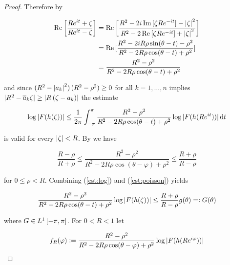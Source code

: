 \begin{proof}
	Therefore by

	\begin{equation*}
		\begin{aligned}
			\Re \sbr[3]{\frac{R e^{it} + \zeta}{R e^{it} - \zeta}} &= \Re \sbr[3]{\frac{R^2 - 2i \Im \sbr[0]{ \zeta R e^{-it} } - \abs[0]{ \zeta }^2}{R^2 - 2\Re \sbr[0]{ \zeta R e^{-it} } + \abs[0]{ \zeta }^2}}\\ &= \Re \sbr[0]{\frac{R^2 - 2iR\rho \sin( \theta - t ) - \rho^2 }{R^2 - 2R\rho \cos( \theta - t ) + \rho^2}}\\
			&= \frac{R^2 - \rho^2}{R^2 - 2R\rho \cos( \theta - t ) + \rho^2}
		\end{aligned}
	\end{equation*}

	\noindent and since $\del[0]{ R^2 - \abs[0]{ a_k }^2 }\del[0]{ R^2 - \rho^2 }\geq 0$ for all $k = 1,\dots,n$ implies $\abs[0]{ R^2 - \overline{a}_k\zeta } \geq \abs[0]{ R\del[0]{ \zeta - a_k}}$ the estimate 

	\begin{equation}
		\log\abs[0]{ F(h(\zeta))} \leq \frac{1}{2\pi}\int_{-\pi}^\pi \frac{R^2 - \rho^2}{R^2 - 2R\rho \cos( \theta - t ) + \rho^2}\log\abs[0]{ F(h(R e^{it}))}\d t
	\end{equation}

	\noindent is valid for every $\abs[0]{ \zeta } < R$. By \cite[236]{rudin:rc_analysis:1987} we have

	\begin{equation}
		\frac{R - \rho}{R + \rho} \leq \frac{R^2 - \rho^2}{R^2 - 2R\rho\cos(\theta - \varphi) + \rho^2} \leq \frac{R + \rho}{R - \rho}
		\label{est:poisson}
	\end{equation}
	
	\noindent for $0 \leq \rho < R$. Combining (\ref{est:log}) and (\ref{est:poisson}) yields 

\begin{equation}
	\frac{R^2 - \rho^2}{R^2 - 2R\rho \cos( \theta - t ) + \rho^2}\log\abs[0]{ F(h(\zeta))} \leq \frac{R + \rho}{R - \rho}g( \theta ) =: G( \theta )
\end{equation}

\noindent where $G \in L^1\intcc{-\pi,\pi}$. For $0 < R < 1$ let

\begin{equation*}
	f_R(\varphi) := \frac{R^2 - \rho^2}{R^2 - 2R\rho\cos(\theta - \varphi) + \rho^2}\log\abs[0]{ F(h(Re^{i\varphi}))}
\end{equation*}


\end{proof}
